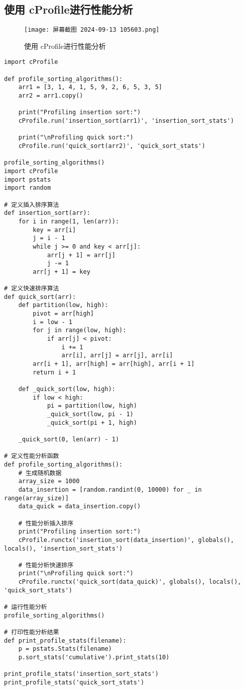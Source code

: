 \documentclass[a4paper, 12pt]{article}
\begin{document}
\subsection{使用 cProfile进行性能分析}
\begin{figure}[H]
    \centering
    \texttt{[image: 屏幕截图 2024-09-13 105603.png]}
    \caption{使用 cProfile进行性能分析}
\end{figure}
\begin{lstlisting}
import cProfile

def profile_sorting_algorithms():
    arr1 = [3, 1, 4, 1, 5, 9, 2, 6, 5, 3, 5]
    arr2 = arr1.copy()

    print("Profiling insertion sort:")
    cProfile.run('insertion_sort(arr1)', 'insertion_sort_stats')

    print("\nProfiling quick sort:")
    cProfile.run('quick_sort(arr2)', 'quick_sort_stats')

profile_sorting_algorithms()
import cProfile
import pstats
import random

# 定义插入排序算法
def insertion_sort(arr):
    for i in range(1, len(arr)):
        key = arr[i]
        j = i - 1
        while j >= 0 and key < arr[j]:
            arr[j + 1] = arr[j]
            j -= 1
        arr[j + 1] = key

# 定义快速排序算法
def quick_sort(arr):
    def partition(low, high):
        pivot = arr[high]
        i = low - 1
        for j in range(low, high):
            if arr[j] < pivot:
                i += 1
                arr[i], arr[j] = arr[j], arr[i]
        arr[i + 1], arr[high] = arr[high], arr[i + 1]
        return i + 1

    def _quick_sort(low, high):
        if low < high:
            pi = partition(low, high)
            _quick_sort(low, pi - 1)
            _quick_sort(pi + 1, high)

    _quick_sort(0, len(arr) - 1)

# 定义性能分析函数
def profile_sorting_algorithms():
    # 生成随机数据
    array_size = 1000
    data_insertion = [random.randint(0, 10000) for _ in range(array_size)]
    data_quick = data_insertion.copy()

    # 性能分析插入排序
    print("Profiling insertion sort:")
    cProfile.runctx('insertion_sort(data_insertion)', globals(), locals(), 'insertion_sort_stats')

    # 性能分析快速排序
    print("\nProfiling quick sort:")
    cProfile.runctx('quick_sort(data_quick)', globals(), locals(), 'quick_sort_stats')

# 运行性能分析
profile_sorting_algorithms()

# 打印性能分析结果
def print_profile_stats(filename):
    p = pstats.Stats(filename)
    p.sort_stats('cumulative').print_stats(10)

print_profile_stats('insertion_sort_stats')
print_profile_stats('quick_sort_stats')
\end{lstlisting}
\end{document}
